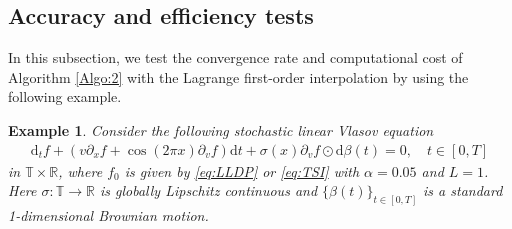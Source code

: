 \documentclass[11pt,reqno]{amsproc}
\newtheorem{example}[Def]{Example}
\newcommand{\ud}{\mathrm d}
\newcommand{\R}{\mathbb{R}}
\numberwithin{equation}{section}
\begin{document}
\subsection{Accuracy and efficiency tests}\label{S5.1}
In this subsection, we test the convergence rate and computational cost of Algorithm \ref{Algo:2} with the Lagrange first-order interpolation by using the following example.
\begin{example}\label{exp:CA}
Consider the following stochastic linear Vlasov equation
\begin{align*}
	\ud_tf +\left(v\partial_xf+\cos(2\pi x)\partial_vf\right)\ud t
	+\sigma(x)\partial_v f\odot \ud \beta(t)=0,\quad t\in[0,T]
\end{align*}
in $\mathbb T\times\R$, where $f_0$ is given by \eqref{eq:LLDP} or \eqref{eq:TSI} with $\alpha=0.05$ and $L=1$. Here $\sigma:\mathbb{T}\to\R$ is globally Lipschitz continuous and $\{\beta(t)\}_{t\in[0,T]}$ is a standard 1-dimensional Brownian motion.
\end{example}
\end{document}

